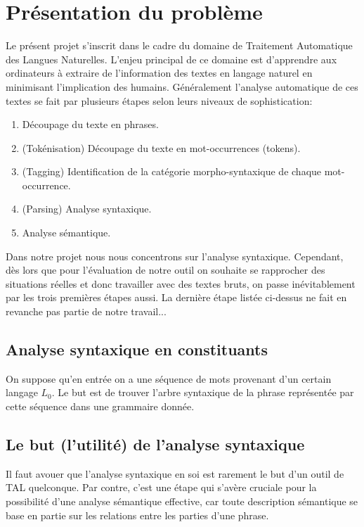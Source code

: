 \documentclass[12pt]{article}
\begin{document}
\section{Pr\'esentation du probl\`eme}

Le pr\'esent projet s'inscrit dans le cadre du domaine de Traitement Automatique
des Langues Naturelles. L'enjeu principal de ce domaine est d'apprendre aux ordinateurs  \`a extraire de l'information des textes en langage naturel en minimisant l'implication des humains. G\'en\'eralement l'analyse automatique de ces textes se fait par plusieurs \'etapes selon leurs niveaux de sophistication:
\begin{enumerate}
\item D\'ecoupage du texte en phrases.
\item (Tok\'enisation) D\'ecoupage du texte en mot-occurrences (tokens).
\item (Tagging) Identification de la cat\'egorie morpho-syntaxique de chaque mot-occurrence.
\item (Parsing) Analyse syntaxique.
\item Analyse s\'emantique.
\end{enumerate}

Dans notre projet nous nous concentrons sur l'analyse syntaxique. Cependant, d\`es lors que pour l'\'evaluation de notre outil on souhaite se rapprocher des situations r\'eelles et donc travailler avec des textes bruts, on passe in\'evitablement par les trois premi\`eres \'etapes aussi. La derni\`ere \'etape list\'ee ci-dessus ne fait en revanche pas partie de notre travail...

\subsection{Analyse syntaxique en constituants}
 On suppose qu'en entr\'ee on a une s\'equence de mots provenant d'un certain langage $L_0$. Le but est de trouver l'arbre syntaxique de la phrase repr\'esent\'ee par cette s\'equence dans une grammaire donn\'ee.

\subsection{Le but (l'utilit\'e) de l'analyse syntaxique}

Il faut avouer que l'analyse syntaxique en soi est rarement le but d'un outil de
TAL quelconque. Par contre, c'est une \'etape qui s'av\`ere cruciale pour la
possibilit\'e d'une analyse s\'emantique effective, car toute description
s\'emantique se base en partie sur les relations entre les parties d'une
phrase.
\end{document}
